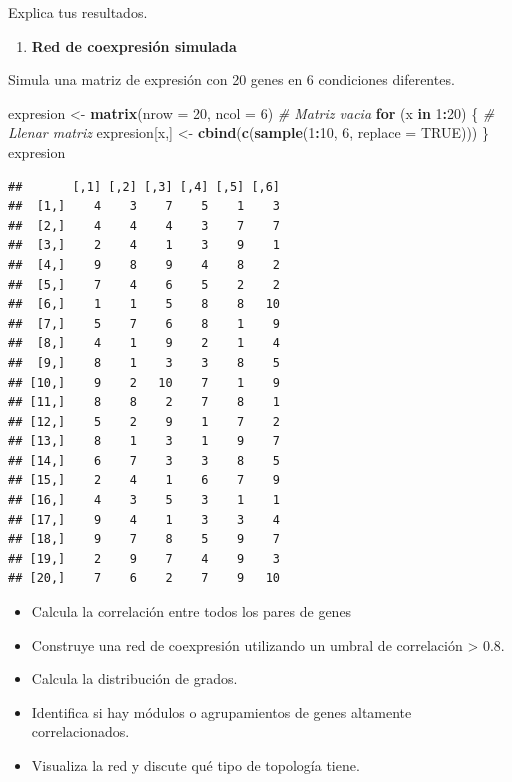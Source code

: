 \documentclass[
]{article}
\newenvironment{Shaded}{\begin{snugshade}}{\end{snugshade}}
\newcommand{\AttributeTok}[1]{\textcolor[rgb]{0.13,0.29,0.53}{#1}}
\newcommand{\CommentTok}[1]{\textcolor[rgb]{0.56,0.35,0.01}{\textit{#1}}}
\newcommand{\ConstantTok}[1]{\textcolor[rgb]{0.56,0.35,0.01}{#1}}
\newcommand{\ControlFlowTok}[1]{\textcolor[rgb]{0.13,0.29,0.53}{\textbf{#1}}}
\newcommand{\DecValTok}[1]{\textcolor[rgb]{0.00,0.00,0.81}{#1}}
\newcommand{\FunctionTok}[1]{\textcolor[rgb]{0.13,0.29,0.53}{\textbf{#1}}}
\newcommand{\NormalTok}[1]{#1}
\newcommand{\OtherTok}[1]{\textcolor[rgb]{0.56,0.35,0.01}{#1}}
\newcommand{\SpecialCharTok}[1]{\textcolor[rgb]{0.81,0.36,0.00}{\textbf{#1}}}
\providecommand{\tightlist}{%
  \setlength{\itemsep}{0pt}\setlength{\parskip}{0pt}}
\begin{document}
Explica tus resultados.

\begin{enumerate}
\def\labelenumi{\arabic{enumi}.}
\setcounter{enumi}{4}
\tightlist
\item
  \textbf{Red de coexpresión simulada}
\end{enumerate}

Simula una matriz de expresión con 20 genes en 6 condiciones diferentes.

\begin{Shaded}
\begin{Highlighting}[]
\NormalTok{expresion }\OtherTok{\textless{}{-}} \FunctionTok{matrix}\NormalTok{(}\AttributeTok{nrow =} \DecValTok{20}\NormalTok{, }\AttributeTok{ncol =} \DecValTok{6}\NormalTok{) }\CommentTok{\# Matriz vacia}
\ControlFlowTok{for}\NormalTok{ (x }\ControlFlowTok{in} \DecValTok{1}\SpecialCharTok{:}\DecValTok{20}\NormalTok{) \{ }\CommentTok{\# Llenar matriz}
\NormalTok{  expresion[x,] }\OtherTok{\textless{}{-}} \FunctionTok{cbind}\NormalTok{(}\FunctionTok{c}\NormalTok{(}\FunctionTok{sample}\NormalTok{(}\DecValTok{1}\SpecialCharTok{:}\DecValTok{10}\NormalTok{, }\DecValTok{6}\NormalTok{, }\AttributeTok{replace =} \ConstantTok{TRUE}\NormalTok{)))}
\NormalTok{\}}
\NormalTok{expresion}
\end{Highlighting}
\end{Shaded}

\begin{verbatim}
##       [,1] [,2] [,3] [,4] [,5] [,6]
##  [1,]    4    3    7    5    1    3
##  [2,]    4    4    4    3    7    7
##  [3,]    2    4    1    3    9    1
##  [4,]    9    8    9    4    8    2
##  [5,]    7    4    6    5    2    2
##  [6,]    1    1    5    8    8   10
##  [7,]    5    7    6    8    1    9
##  [8,]    4    1    9    2    1    4
##  [9,]    8    1    3    3    8    5
## [10,]    9    2   10    7    1    9
## [11,]    8    8    2    7    8    1
## [12,]    5    2    9    1    7    2
## [13,]    8    1    3    1    9    7
## [14,]    6    7    3    3    8    5
## [15,]    2    4    1    6    7    9
## [16,]    4    3    5    3    1    1
## [17,]    9    4    1    3    3    4
## [18,]    9    7    8    5    9    7
## [19,]    2    9    7    4    9    3
## [20,]    7    6    2    7    9   10
\end{verbatim}

\begin{itemize}
\tightlist
\item
  Calcula la correlación entre todos los pares de genes
\item
  Construye una red de coexpresión utilizando un umbral de correlación
  \textgreater{} 0.8.\\
\item
  Calcula la distribución de grados.
\item
  Identifica si hay módulos o agrupamientos de genes altamente
  correlacionados.
\item
  Visualiza la red y discute qué tipo de topología tiene.
\end{itemize}
\end{document}
